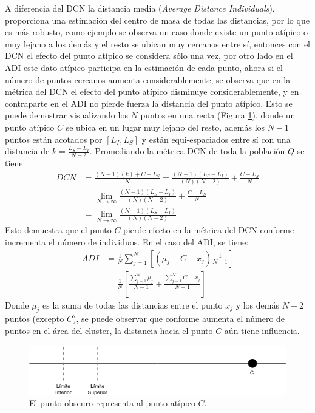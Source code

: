 A diferencia del DCN la distancia media (\textit{Average Distance Individuals}), proporciona una estimación del centro de masa de todas las distancias, por lo que es más robusto, como ejemplo se observa un caso donde existe un punto atípico o muy lejano a los demás y el resto se ubican muy cercanos entre sí, entonces con el DCN el efecto del punto atípico se considera sólo una vez, por otro lado en el ADI este dato atípico participa en la estimación de cada punto, ahora si el número de puntos cercanos aumenta considerablemente, se observa que en la métrica del DCN el efecto del punto atípico disminuye considerablemente, y en contraparte en el ADI no pierde fuerza la distancia del punto atípico. 
%
Esto se puede demostrar visualizando los $N$ puntos en una recta (Figura \ref{fig:Recta_DCN}), donde un punto atípico $C$ se ubica en un lugar muy lejano del resto, además los $N-1$ puntos están acotados por $[L_I, L_S]$ y están equi-espaciados entre sí con una distancia de $k = \frac{L_S - L_I}{ N-2 }$. Promediando la métrica DCN de toda la población $Q$ se tiene:
%
\begin{equation}
   \begin{split}
      DCN &= \frac{ (N-1)(k) + C - L_S }{N} = \frac{(N-1)(L_S-L_I)}{(N)(N-2)} + \frac{C- L_S}{N} \\
      			 &= \lim_{N \rightarrow \infty} \frac{(N-1)(L_S-L_I)}{(N)(N-2)} + \frac{C- L_S}{N} \\ 
      			 &= \lim_{N \rightarrow \infty} \frac{(N-1)(L_S-L_I)}{(N)(N-2)}
   \end{split}
\end{equation}
Esto demuestra que el punto $C$ pierde efecto en la métrica del DCN conforme incrementa el número de individuos.
%
En el caso del ADI, se tiene:
\begin{equation}
\begin{split}
	ADI &= \frac{1}{N} \sum_{j=1}^N \left [ (\mu_j + C - x_j ) \frac{1}{N-1} \right  ] \\
		    &= \frac{1}{N} \left [  \frac{  \sum_{j=1}^N   \mu_j}{ N-1}  +  \frac{  \sum_{j=1}^N   C - x_j }{ N-1}  \right  ]
\end{split}
\end{equation}
Donde $\mu_j$ es la suma de todas las distancias entre el punto $x_j$ y los demás $N-2$ puntos (excepto $C$), se puede observar que conforme aumenta el número de puntos en el área del cluster, la distancia hacia el punto $C$ aún tiene influencia.

\begin{figure}[H]
\centering
\scriptsize
\includegraphics[scale=0.4]
{Figures_Chapter2/RECTA_DCN_ADI.png}
\decoRule
\caption{El punto obscuro representa al punto atípico $C$.}
\label{fig:Recta_DCN}
\end{figure}

